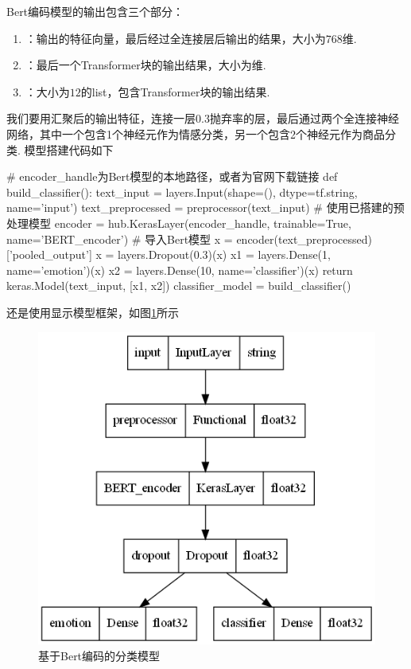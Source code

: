 \documentclass[12pt, a4paper, oneside]{ctexart}
\numberwithin{equation}{section}  %
\begin{document}
Bert编码模型的输出包含三个部分：
\begin{enumerate}
  \item {}：输出的特征向量，最后经过全连接层后输出的结果，大小为$768$维.
  \item {}：最后一个Transformer块的输出结果，大小为\pythoninline{[128, 768]}维.
  \item {}：大小为$12$的list，包含Transformer块的输出结果.
\end{enumerate}
我们要用汇聚后的输出特征，连接一层0.3抛弃率的层，最后通过两个全连接神经网络，其中一个包含1个神经元作为情感分类，另一个包含2个神经元作为商品分类. 模型搭建代码如下
\begin{pythoncode}
# encoder_handle为Bert模型的本地路径，或者为官网下载链接
def build_classifier():
    text_input = layers.Input(shape=(), dtype=tf.string, name='input')
    text_preprocessed = preprocessor(text_input)  # 使用已搭建的预处理模型
    encoder = hub.KerasLayer(encoder_handle, trainable=True, name='BERT_encoder')  # 导入Bert模型
    x = encoder(text_preprocessed)['pooled_output']
    x = layers.Dropout(0.3)(x)
    x1 = layers.Dense(1, name='emotion')(x)
    x2 = layers.Dense(10, name='classifier')(x)
    return keras.Model(text_input, [x1, x2])
classifier_model = build_classifier()
\end{pythoncode}
还是使用显示模型框架，如图\ref{fig-bert-encoder}所示
\begin{figure}[htbp]
  \centering
  \includegraphics[scale=0.5]{Bert_encoder.png}
  \setlength{\abovecaptionskip}{0cm}
  \caption{基于Bert编码的分类模型}
  \label{fig-bert-encoder}
\end{figure}
\end{document}
